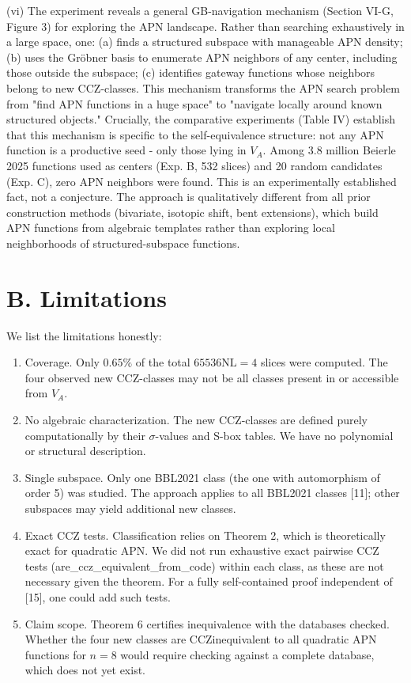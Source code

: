 \documentclass[10pt]{article}
\begin{document}
(vi) The experiment reveals a general GB-navigation mechanism (Section VI-G, Figure 3) for exploring the APN landscape. Rather than searching exhaustively in a large space, one: (a) finds a structured subspace with manageable APN density; (b) uses the Gröbner basis to enumerate APN neighbors of any center, including those outside the subspace; (c) identifies gateway functions whose neighbors belong to new CCZ-classes. This mechanism transforms the APN search problem from "find APN functions in a huge space" to "navigate locally around known structured objects." Crucially, the comparative experiments (Table IV) establish that this mechanism is specific to the self-equivalence structure: not any APN function is a productive seed - only those lying in $V_{A}$. Among 3.8 million Beierle 2025 functions used as centers (Exp. B, 532 slices) and 20 random candidates (Exp. C), zero APN neighbors were found. This is an experimentally established fact, not a conjecture. The approach is qualitatively different from all prior construction methods (bivariate, isotopic shift, bent extensions), which build APN functions from algebraic templates rather than exploring local neighborhoods of structured-subspace functions.

\section*{B. Limitations}
We list the limitations honestly:

\begin{enumerate}
  \item Coverage. Only $0.65 \%$ of the total $65536 \mathrm{NL}=4$ slices were computed. The four observed new CCZ-classes may not be all classes present in or accessible from $V_{A}$.
  \item No algebraic characterization. The new CCZ-classes are defined purely computationally by their $\sigma$-values and S-box tables. We have no polynomial or structural description.
  \item Single subspace. Only one BBL2021 class (the one with automorphism of order 5) was studied. The approach applies to all BBL2021 classes [11]; other subspaces may yield additional new classes.
  \item Exact CCZ tests. Classification relies on Theorem 2, which is theoretically exact for quadratic APN. We did not run exhaustive exact pairwise CCZ tests (are\_ccz\_equivalent\_from\_code) within each class, as these are not necessary given the theorem. For a fully self-contained proof independent of [15], one could add such tests.
  \item Claim scope. Theorem 6 certifies inequivalence with the databases checked. Whether the four new classes are CCZinequivalent to all quadratic APN functions for $n=8$ would require checking against a complete database, which does not yet exist.
\end{enumerate}
\end{document}
